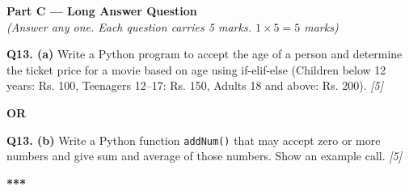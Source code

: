 \documentclass[11pt,a4paper]{article}
\newcommand{\pts}[1]{\hfill \textit{[#1]}}
\begin{document}
\bigskip

\begin{center}
  \textbf{Part C --- Long Answer Question}\\
  \textit{(Answer any one. Each question carries 5 marks. $1 \times 5 = 5$ marks)}
\end{center}

\noindent \textbf{Q13. (a)} Write a Python program to accept the age of a person and determine the ticket price for a movie based on age using if-elif-else (Children below 12 years: Rs. 100, Teenagers 12--17: Rs. 150, Adults 18 and above: Rs. 200). \pts{5}\\
\begin{center}\textbf{OR}\end{center}
\noindent \textbf{Q13. (b)} Write a Python function \texttt{addNum()} that may accept zero or more numbers and give sum and average of those numbers. Show an example call. \pts{5}

\bigskip
\begin{center}
  \textbf{***}
\end{center}
\end{document}
